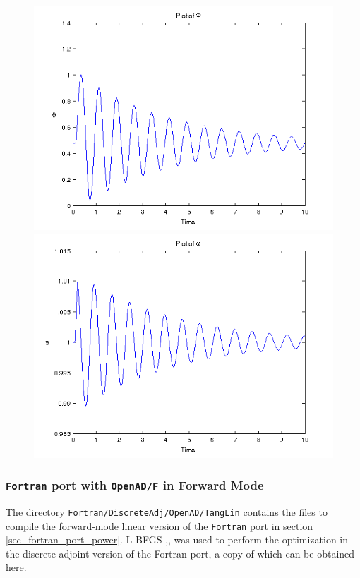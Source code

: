 \clearpage
\begin{figure}[h]
\centering
\includegraphics[width=1.2\linewidth]{../Code/miniApps/power_grid/phi_fortran_da_oad_rj.png}
\label{fig:phi_fortran_da_oad_rj}
\includegraphics[width=1.2\linewidth]{../Code/miniApps/power_grid/omega_fortran_da_oad_rj.png}
\label{fig:omega_fortran_da_oad_rj}
\end{figure}
\clearpage
\subsubsection{\texttt{Fortran} port with \texttt{OpenAD/F} in Forward Mode}
\noindent The directory \texttt{Fortran/DiscreteAdj/OpenAD/TangLin} contains the files to compile the forward-mode linear version of the \texttt{Fortran} port in section \ref{sec_fortran_port_power}. L-BFGS \cite{Byrd_1996},\cite{Zhu_1997},\cite{Morales_2011} was used to perform the optimization in the discrete adjoint version of the Fortran port, a copy of which can be obtained \href{http://users.iems.northwestern.edu/~nocedal/lbfgsb.html}{here}.\\

